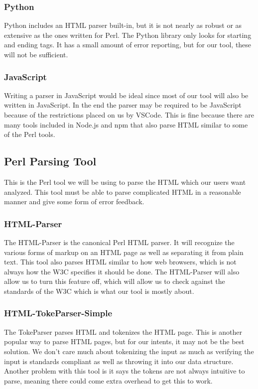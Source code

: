 \documentclass[letterpaper,10pt,titlepage,draftclsnofoot,onecolumn,onesided] {IEEEtran}
\begin{document}
\subsubsection{Python}
Python includes an HTML parser built-in, but it is not nearly as robust or as extensive as the ones written for Perl. 
The Python library only looks for starting and ending tags.
It has a small amount of error reporting, but for our tool, these will not be sufficient.
\cite{python}

\subsubsection{JavaScript}
Writing a parser in JavaScript would be ideal since most of our tool will also be written in JavaScript.
In the end the parser may be required to be JavaScript because of the restrictions placed on us by VSCode.
This is fine because there are many tools included in Node.js and npm that also parse HTML similar to some of the Perl tools.
\cite{jsdom}\cite{htmlparser}

\subsection{Perl Parsing Tool}
This is the Perl tool we will be using to parse the HTML which our users want analyzed. 
This tool must be able to parse complicated HTML in a reasonable manner and give some form of error feedback.

\subsubsection{HTML-Parser}
The HTML-Parser is the canonical Perl HTML parser. 
It will recognize the various forms of markup on an HTML page as well as separating it from plain text.
This tool also parses HTML similar to how web browsers, which is not always how the W3C specifies it should be done.
The HTML-Parser will also allow us to turn this feature off, which will allow us to check against the standards of the W3C which is what our tool is mostly about.
\cite{perlhtmlparser}

\subsubsection{HTML-TokeParser-Simple}
The TokeParser parses HTML and tokenizes the HTML page.
This is another popular way to parse HTML pages, but for our intents, it may not be the best solution.
We don't care much about tokenizing the input as much as verifying the input is standards compliant as well as throwing it into our data structure. 
Another problem with this tool is it says the tokens are not always intuitive to parse, meaning there could come extra overhead to get this to work. 
\cite{htmltokeparser}
\end{document}
